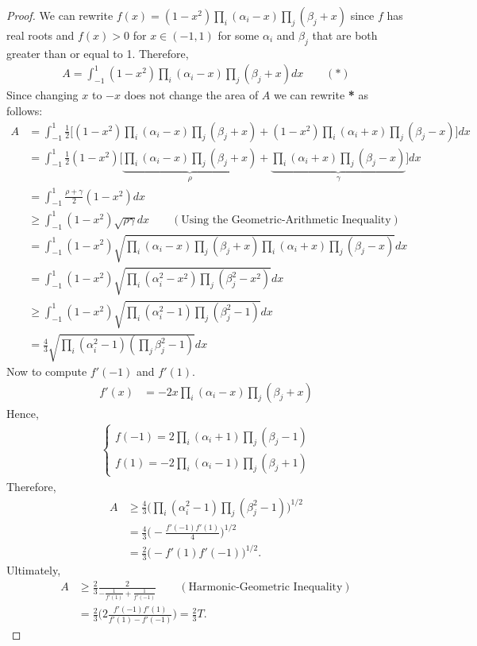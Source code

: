 \documentclass[12pt]{extreport}
\begin{document}
\begin{proof}
We can rewrite $f(x) = (1-x^2) \prod_{i}(\alpha_i - x) \prod_{j}(\beta_j + x)$ since $f$ has real roots and $f(x) > 0$ for $x \in (-1, 1)$ for some $\alpha_{i}$ and $\beta_{j}$ that are both greater than or equal to 1. Therefore,
\begin{align*}
A = \int_{-1}^{1} (1-x^2) \prod_{i}(\alpha_i - x) \prod_{j}(\beta_j + x) dx \qquad (\textbf{*})
\end{align*}
Since changing $x$ to $-x$ does not change the area of $A$ we can rewrite \textbf{*} as follows:
\begin{align*}
A &= \int_{-1}^{1} \frac{1}{2} \big[  (1-x^2) \prod_{i}(\alpha_i - x) \prod_{j}(\beta_j + x) + (1-x^2) \prod_{i}(\alpha_i + x) \prod_{j}(\beta_j - x)\big] dx \\&= \int_{-1}^{1} \frac{1}{2}(1-x^2) \big[ \underbrace{\prod_{i}(\alpha_i - x) \prod_{j}(\beta_j + x)}_{\rho} + \underbrace{\prod_{i}(\alpha_i + x) \prod_{j}(\beta_j - x)}_{\gamma} \big] dx \\&= \int_{-1}^{1} \frac{\rho + \gamma}{2}(1-x^2) dx \\&\geq \int_{-1}^{1} (1-x^2)\sqrt{\rho\gamma} dx \qquad (\text{Using the Geometric-Arithmetic Inequality}) \\&= \int_{-1}^{1} (1-x^2)\sqrt{\prod_{i}(\alpha_i - x) \prod_{j}(\beta_j + x)\prod_{i}(\alpha_i + x) \prod_{j}(\beta_j - x)} dx \\&= \int_{-1}^{1} (1-x^2) \sqrt{\prod_{i} (\alpha_i^2 - x^2)\prod_{j} (\beta_{j}^2 - x^2)} dx \\&\geq \int_{-1}^{1} (1-x^2) \sqrt{\prod_{i} (\alpha_i^2 - 1)\prod_{j} (\beta_{j}^2 - 1)} dx \\&= \frac{4}{3}\sqrt{\prod_{i}(\alpha_i^2 - 1)(\prod_{j} \beta_j^2-1)} dx
\end{align*} 
Now to compute $f'(-1)$ and $f'(1)$.
\begin{align*}
f'(x) &= -2x \prod_{i} (\alpha_i - x) \prod_{j} (\beta_j + x)
\end{align*}
Hence,
\begin{align*}
\left\{ \begin{array}{lr} f(-1) = 2\prod_{i}(\alpha_i + 1)\prod_{j}(\beta_j - 1) \\
f(1) = -2\prod_{i}(\alpha_i - 1)\prod_{j}(\beta_j + 1)
\end{array} \right.
\end{align*}
Therefore,
\begin{align*}
A &\geq \frac{4}{3}\big(\prod_{i}(\alpha_i^2 - 1)\prod_{j}(\beta_j^2 - 1)\big)^{1/2} \\&= \frac{4}{3} \big( -\frac{f'(-1)f'(1)}{4} \big)^{1/2} \\&= \frac{2}{3}\big(-f'(1)f'(-1)\big)^{1/2}.
\end{align*}
Ultimately,
\begin{align*}
A &\geq \frac{2}{3} \frac{2}{-\frac{1}{f'(1)} + \frac{1}{f'(-1)}} \qquad (\text{Harmonic-Geometric Inequality}) \\&= \frac{2}{3}\Big(2\frac{f'(-1)f'(1)}{f'(1)-f'(-1)}\Big) = \frac{2}{3}T.
\end{align*}
\end{proof}
\end{document}

